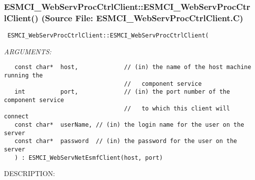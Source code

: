  
\setlength{\oldparskip}{\parskip}
\setlength{\parskip}{1.5ex}
\setlength{\oldparindent}{\parindent}
\setlength{\parindent}{0pt}
\setlength{\oldbaselineskip}{\baselineskip}
\setlength{\baselineskip}{11pt}
 
\def\bv{\begin{verbatim}}
\def\ev{\end{verbatim}}
\def\be{\begin{equation}}
\def\ee{\end{equation}}
\def\bea{\begin{eqnarray}}
\def\eea{\end{eqnarray}}
\def\bi{\begin{itemize}}
\def\ei{\end{itemize}}
\def\bn{\begin{enumerate}}
\def\en{\end{enumerate}}
\def\bd{\begin{description}}
\def\ed{\end{description}}
\def\({\left (}
\def\){\right )}
\def\[{\left [}
\def\]{\right ]}
\def\<{\left  \langle}
\def\>{\right \rangle}
\def\cI{{\cal I}}
\def\diag{\mathop{\rm diag}}
\def\tr{\mathop{\rm tr}}


 
\subsubsection{ESMCI\_WebServProcCtrlClient::ESMCI\_WebServProcCtrlClient() (Source File: ESMCI\_WebServProcCtrlClient.C)}


  
\begin{verbatim} ESMCI_WebServProcCtrlClient::ESMCI_WebServProcCtrlClient(\end{verbatim}{\em ARGUMENTS:}
\begin{verbatim}   const char*  host,             // (in) the name of the host machine running the
                                  //   component service
   int          port,             // (in) the port number of the component service
                                  //   to which this client will connect
   const char*  userName, // (in) the login name for the user on the server
   const char*  password  // (in) the password for the user on the server
   ) : ESMCI_WebServNetEsmfClient(host, port)\end{verbatim}
{\sf DESCRIPTION:\\ }


